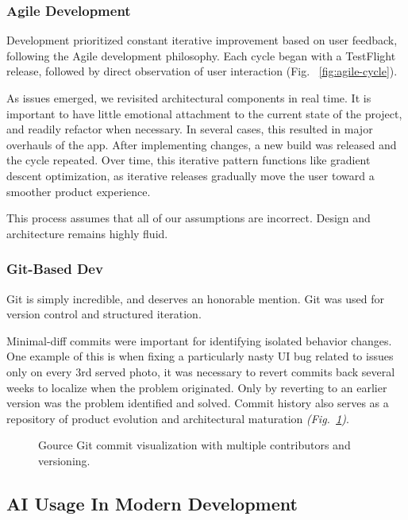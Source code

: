 \documentclass[12pt]{article}
\begin{document}
\subsubsection{Agile Development }

Development prioritized constant iterative improvement based on user feedback, following the Agile development philosophy. Each cycle began with a TestFlight release, followed by direct observation of user interaction (Fig. ~\ref{fig:agile-cycle}).

As issues emerged, we revisited architectural components in real time. It is important to have little emotional attachment to the current state of the project, and readily refactor when necessary. In several cases, this resulted in major overhauls of the app. After implementing changes, a new build was released and the cycle repeated. Over time, this iterative pattern functions like gradient descent optimization, as iterative releases gradually move the user toward a smoother product experience.

This process assumes that all of our assumptions are incorrect. Design and architecture remains highly fluid.

\subsubsection{Git-Based Dev }

Git is simply incredible, and deserves an honorable mention. Git was used for version control and structured iteration.

Minimal-diff commits were important for identifying isolated behavior changes. One example of this is when fixing a particularly nasty UI bug related to issues only on every 3rd served photo, it was necessary to revert commits back several weeks to localize when the problem originated. Only by reverting to an earlier version was the problem identified and solved. Commit history also serves as a repository of product evolution and architectural maturation \textit{(Fig.~\ref{fig:repo-commit-diagram})}.

\begin{figure}[!htbp]
  \centering
  \caption[Gource Git Commits]{Gource Git commit visualization with multiple contributors and versioning.}
  \label{fig:repo-commit-diagram}
\end{figure}

\subsection{AI Usage In Modern Development }
\end{document}
